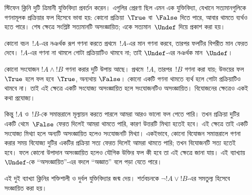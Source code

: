 \documentclass[../../../include/open-logic-section]{subfiles}
\begin{document}


স্টিফেন ক্লিনি দুটি ত্রিমানী যুক্তিবিদ্যা প্রবর্তন করেন। এগুলির প্রেরণা ছিল
এমন এক যুক্তিবিদ্যা, যেখানে সত্যমানগুলিকে গণনামূলক প্রক্রিয়ার ফল হিসেবে
ভাবা হয়: কোনো প্রক্রিয়া~$\True$ বা~$\False$ দিতে পারে, আবার থামতে
ব্যর্থও হতে পারে। শেষ ক্ষেত্রে সংশ্লিষ্ট সত্যমানটি অসংজ্ঞায়িত; একে
সত্যমান~$\Undef$ দিয়ে প্রকাশ করা হয়।

কোনো বচন~$!A$-এর নঞর্থক রূপ গণনা করতে প্রথমে~$!A$-এর মান গণনা করবে,
তারপর ফলটির বিপরীত মান ফেরত দেবে। $!A$-এর গণনা না থামলে গোটা
প্রক্রিয়াটিও থামবে না; তাই $\Undef$-এর নঞর্থক মান~$\Undef$।

কোনো সংযোজন $!A \land !B$ গণনা করার দুটি উপায় আছে। প্রথমে~$!A$,
তারপর~$!B$ গণনা করা যায়; উভয়ের ফল~$\True$ হলে ফল হবে~$\True$, অন্যথায়
$\False$। কোনো একটি গণনা থামতে ব্যর্থ হলে গোটা প্রক্রিয়াটিও থামবে না।
তাই এই ক্ষেত্রে একটি সংযোজ্য অসংজ্ঞায়িত হলে সংযোজনটিও অসংজ্ঞায়িত।
বিযোজনের ক্ষেত্রেও একই কথা প্রযোজ্য।

কিন্তু $!A$ ও~$!B$-কে সমান্তরালে মূল্যায়ন করতে পারলে আমরা আরও ভালো ফল
পেতে পারি। তখন প্রক্রিয়া দুটির একটি থেমে~$\False$ ফেরত দিলেই আমরা থামতে
পারি, কারণ উত্তরটি মিথ্যা হতেই হবে। এই ক্ষেত্রে তাই একটি সংযোজ্য মিথ্যা
হলে অন্যটি অসংজ্ঞায়িত হলেও সংযোজনটি মিথ্যা। একইভাবে, কোনো বিযোজন
সমান্তরালে গণনা করার সময় বিযোজ্য দুটির একটির প্রক্রিয়া সত্য ফেরত দিলেই
আমরা থামতে পারি; তখন বিযোজনটি সত্য হতেই হবে। ফলে কোনো উপাদান
অসংজ্ঞায়িত হলেও যৌগিক উক্তির ফল কী হবে তা এই ক্ষেত্রে জানা যায়। এই
ব্যাখ্যায়~$\Undef$-কে “অসংজ্ঞায়িত”-এর বদলে “অজ্ঞাত” বলে পড়া যেতে পারে।

এই দুই ব্যাখ্যা ক্লিনির শক্তিশালী ও দুর্বল যুক্তিবিদ্যার জন্ম দেয়।
শর্তবচনকে $\lnot !A \lor !B$-এর সমতুল্য হিসেবে সংজ্ঞায়িত করা হয়।
\end{document}
